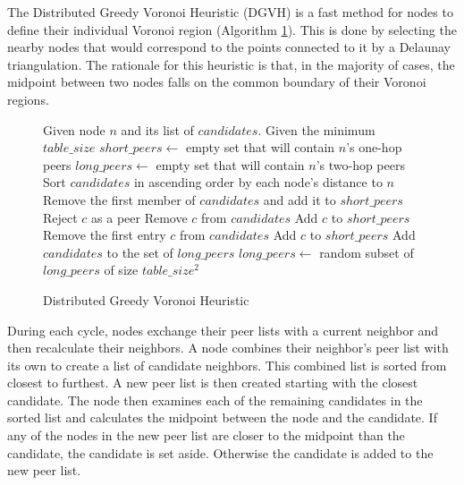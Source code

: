 The Distributed Greedy Voronoi Heuristic (DGVH) is a fast method for nodes to define their individual Voronoi region (Algorithm \ref{alg:dgvh}). 
This is done by selecting the nearby nodes that would correspond to the points connected to it by a Delaunay triangulation.
The rationale for this heuristic is that, in the majority of cases, the midpoint between two nodes falls on the common boundary of their Voronoi regions.




\begin{figure} %
\caption{Distributed Greedy Voronoi Heuristic}
\label{alg:dgvh}
\begin{algorithmic}[1]  %
	 \State Given node $n$ and its list of $candidates$.
   	 \State Given the minimum $table\_size$
    \State $short\_peers \leftarrow$ empty set that will contain $n$'s one-hop peers
	 \State $long\_peers \leftarrow$ empty set that will contain $n$'s two-hop peers    
    \State Sort $candidates$ in ascending order by each node's distance to $n$
    \State Remove the first member of $candidates$ and add it to $short\_peers$
        	\State Reject $c$ as a peer
        \Else
        	\State Remove $c$ from $candidates$
        	\State Add $c$ to $short\_peers$
        \EndIf
    \EndFor
    	\State Remove the first entry $c$ from $candidates$
    	\State Add $c$ to $short\_peers$
    \EndWhile
    	\State Add $candidates$ to the set of $long\_peers$	
        		\State $long\_peers \leftarrow$ random subset of $long\_peers$ of size $table\_size^2$
      \EndIf
\end{algorithmic}
\end{figure}


During each cycle, nodes exchange their peer lists with a current neighbor and then recalculate their neighbors.  
A node combines their neighbor's peer list with its own to create a list of candidate neighbors.
This combined list is sorted from closest to furthest.
A new peer list is then created starting with the closest candidate.
The node then examines each of the remaining candidates in the sorted list and calculates the midpoint between the node and the candidate.
If any of the nodes in the new peer list are closer to the midpoint than the candidate, the candidate is set aside.  
Otherwise the candidate is added to the new peer list.







